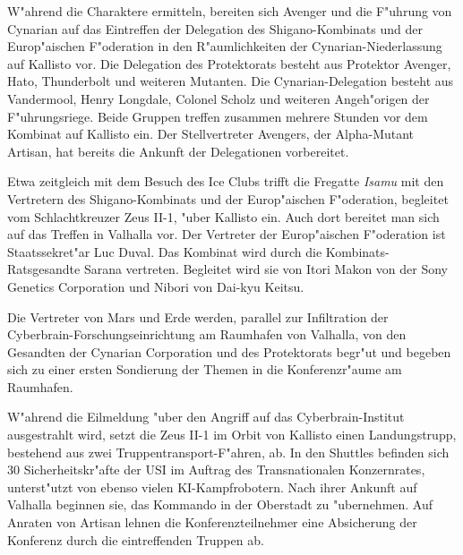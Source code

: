 
W"ahrend die Charaktere ermitteln, bereiten sich Avenger und die F"uhrung von Cynarian auf das Eintreffen der Delegation des Shigano-Kombinats und der Europ"aischen F"oderation in den R"aumlichkeiten der Cynarian-Niederlassung auf Kallisto vor. Die Delegation des Protektorats besteht aus Protektor Avenger, Hato, Thunderbolt und weiteren Mutanten. Die Cynarian-Delegation besteht aus Vandermool, Henry Longdale, Colonel Scholz und weiteren Angeh"origen der F"uhrungsriege. Beide Gruppen treffen zusammen mehrere Stunden vor dem Kombinat auf Kallisto ein. Der Stellvertreter Avengers, der Alpha-Mutant Artisan, hat bereits die Ankunft der Delegationen vorbereitet.

Etwa zeitgleich mit dem Besuch des Ice Clubs trifft die Fregatte \emph{Isamu} mit den Vertretern des Shigano-Kombinats und der Europ"aischen F"oderation, begleitet vom Schlachtkreuzer Zeus II-1, "uber Kallisto ein. Auch dort bereitet man sich auf das Treffen in Valhalla vor. Der Vertreter der Europ"aischen F"oderation ist Staatssekret"ar Luc Duval. Das Kombinat wird durch die Kombinats-Ratsgesandte Sarana vertreten. Begleitet wird sie von Itori Makon von der Sony Genetics Corporation und Nibori von Dai-kyu Keitsu.

Die Vertreter von Mars und Erde werden, parallel zur Infiltration der Cyberbrain-Forschungseinrichtung am Raumhafen von Valhalla, von den Gesandten der Cynarian Corporation und des Protektorats begr"u\3t und begeben sich zu einer ersten Sondierung der Themen in die Konferenzr"aume am Raumhafen.


W"ahrend die Eilmeldung "uber den Angriff auf das Cyberbrain-Institut ausgestrahlt wird, setzt die Zeus II-1 im Orbit von Kallisto einen Landungstrupp, bestehend aus zwei Truppentransport-F"ahren, ab. In den Shuttles befinden sich 30 Sicherheitskr"afte der USI im Auftrag des Transnationalen Konzernrates, unterst"utzt von ebenso vielen KI-Kampfrobotern. Nach ihrer Ankunft auf Valhalla beginnen sie, das Kommando in der Oberstadt zu "ubernehmen. Auf Anraten von Artisan lehnen die Konferenzteilnehmer eine Absicherung der Konferenz durch die eintreffenden Truppen ab.


